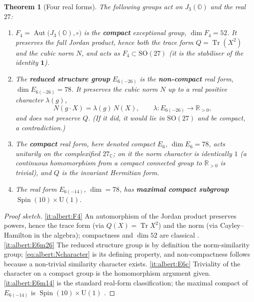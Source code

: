 \documentclass[11pt]{article}
\theoremstyle{plain}
\newtheorem{theorem}{Theorem}[section]
\theoremstyle{definition}
\theoremstyle{remark}
\begin{document}
\begin{theorem}[Four real forms]\label{thm:albert:fourforms}
The following groups act on $J_{3}(\mathbb{O})$ and the real $27$:
\begin{enumerate}
\item\label{it:albert:F4}
  $F_{4}=\operatorname{Aut}\bigl(J_{3}(\mathbb{O}),\circ\bigr)$ is the
  \textbf{compact} exceptional group, $\dim F_{4}=52$. It preserves the
  full Jordan product, hence \emph{both} the trace form
  $Q=\operatorname{Tr}(X^{2})$ \emph{and} the cubic norm $N$, and acts as
  $F_{4}\subset\mathrm{SO}(27)$ (it is the stabiliser of the identity
  $\mathbf 1$).
\item\label{it:albert:E6m26}
  The \textbf{reduced structure group}
  $E_{6(-26)}$ is the \textbf{non-compact} real form,
  $\dim E_{6(-26)}=78$. It preserves the cubic norm $N$ \emph{up to a
  real positive character} $\lambda(g)$,
  \begin{equation}\label{eq:albert:Ncharacter}
    N(g\cdot X)=\lambda(g)\,N(X),\qquad \lambda:E_{6(-26)}\to\mathbb{R}_{>0},
  \end{equation}
  and does \emph{not} preserve $Q$. (If it did, it would lie in
  $\mathrm{SO}(27)$ and be compact, a contradiction.)
\item\label{it:albert:E6c}
  The \textbf{compact} real form, here denoted compact $E_{6}$,
  $\dim E_{6}=78$, acts unitarily on the complexified $27_{\mathbb{C}}$;
  on it the norm character is identically $1$ (a continuous homomorphism
  from a compact connected group to $\mathbb{R}_{>0}$ is trivial), and
  $Q$ is the invariant Hermitian form.
\item\label{it:albert:E6m14}
  The real form $E_{6(-14)}$, $\dim=78$, has \textbf{maximal compact
  subgroup} $\operatorname{Spin}(10)\times\mathrm{U}(1)$.
\end{enumerate}
\end{theorem}

\begin{proof}[Proof sketch]
\ref{it:albert:F4} An automorphism of the Jordan product preserves
powers, hence the trace form (via $Q(X)=\operatorname{Tr}X^{2}$) and the
norm (via Cayley--Hamilton in the algebra); compactness and $\dim 52$ are
classical \cite{Springer:2000}. \ref{it:albert:E6m26} The reduced
structure group is by definition the norm-similarity group;
\eqref{eq:albert:Ncharacter} is its defining property, and non-compactness
follows because a non-trivial similarity character exists. \ref{it:albert:E6c}
Triviality of the character on a compact group is the homomorphism
argument given. \ref{it:albert:E6m14} is the standard real-form
classification; the maximal compact of $E_{6(-14)}$ is
$\operatorname{Spin}(10)\times\mathrm{U}(1)$
\cite{Springer:2000,Slansky:1981,Helgason:1978}.
\end{proof}
\end{document}
